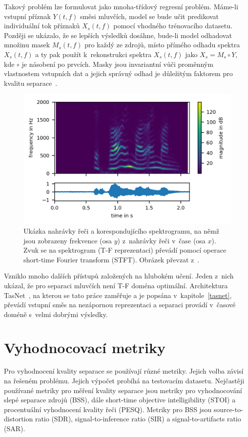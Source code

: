 Takový problém lze formulovat jako mnoha-třídový regresní problém. Máme-li vstupní příznak $Y(t,f)$ směsi mluvčích, model se bude učit predikovat individuální tok příznaků $X_s(t,f)$ pomocí vhodného trénovacího datasetu. Později se ukázalo, že se lepších výsledků dosáhne, bude-li model odhadovat množinu masek $M_s(t,f)$ pro každý ze zdrojů, místo přímého odhadu spektra $X_s(t,f)$ a ty pak použít k~rekonstrukci spektra $X_s(t,f)$ jako $X_s = M_s \circ Y$, kde $\circ$ je násobení po prvcích. Masky jsou invariantní vůči proměnným vlastnostem vstupních dat a jejich správný odhad je důležitým faktorem pro kvalitu separace~\cite{speechseparation}.


\begin{figure}[H]
    \centering
    \includegraphics[scale=1.15]{obrazky-figures/spektrum.png}
    \caption{\label{fig:spektrum}Ukázka nahrávky řeči a korespondujícího spektrogramu, na němž jsou zobrazeny frekvence (osa $y$) z~nahrávky řeči v~čase (osa $x$). Zvuk se na spektrogram (T-F reprezentaci) převádí pomocí operace short-time Fourier transform (STFT). Obrázek převzat z~\cite{speech-spectrogram}.}
\end{figure}


Vzniklo mnoho dalších přístupů založených na hlubokém učení. Jeden z~nich ukázal, že pro separaci mluvčích není T-F doména optimální. Architektura TasNet~\cite{luo2018convtasnet}, na kterou se tato práce zaměřuje a je popsána v~kapitole~\ref{tasnet}, převádí vstupní směs na nezápornou reprezentaci a separaci provádí v~časové doméně s~velmi dobrými výsledky.


\section{Vyhodnocovací metriky}
Pro vyhodnocení kvality separace se používají různé metriky. Jejich volba závisí na řešeném problému. Jejich výpočet probíhá na testovacím datasetu. Nejčastěji používané metriky pro měření kvality separace jsou metriky pro vyhodnocování slepé separace zdrojů (BSS), dále short-time objective intelligibility (STOI) a procentuální vyhodnocení kvality řeči (PESQ). Metriky pro BSS jsou source-to-distortion ratio (SDR), signal-to-inference ratio (SIR) a signal-to-artifacts ratio (SAR).



